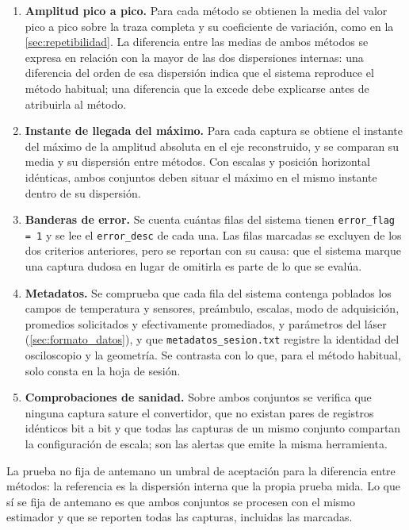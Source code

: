 \begin{enumerate}[leftmargin=*, itemsep=2pt]
  \item \textbf{Amplitud pico a pico.} Para cada método se obtienen la
    media del valor pico a pico sobre la traza completa y su
    coeficiente de variación, como en la \cref{sec:repetibilidad}. La
    diferencia entre las medias de ambos métodos se expresa en relación
    con la mayor de las dos dispersiones internas: una diferencia del
    orden de esa dispersión indica que el sistema reproduce el método
    habitual; una diferencia que la excede debe explicarse antes de
    atribuirla al método.
  \item \textbf{Instante de llegada del máximo.} Para cada captura se
    obtiene el instante del máximo de la amplitud absoluta en el eje
    reconstruido, y se comparan su media y su dispersión entre métodos.
    Con escalas y posición horizontal idénticas, ambos conjuntos deben
    situar el máximo en el mismo instante dentro de su dispersión.
  \item \textbf{Banderas de error.} Se cuenta cuántas filas del sistema
    tienen \texttt{error\_flag = 1} y se lee el \texttt{error\_desc} de
    cada una. Las filas marcadas se excluyen de los dos criterios
    anteriores, pero se reportan con su causa: que el sistema marque
    una captura dudosa en lugar de omitirla es parte de lo que se
    evalúa.
  \item \textbf{Metadatos.} Se comprueba que cada fila del sistema
    contenga poblados los campos de temperatura y sensores, preámbulo,
    escalas, modo de adquisición, promedios solicitados y
    efectivamente promediados, y parámetros del láser
    (\cref{sec:formato_datos}), y que \texttt{metadatos\_sesion.txt}
    registre la identidad del osciloscopio y la geometría. Se contrasta
    con lo que, para el método habitual, solo consta en la hoja de
    sesión.
  \item \textbf{Comprobaciones de sanidad.} Sobre ambos conjuntos se
    verifica que ninguna captura sature el convertidor, que no existan
    pares de registros idénticos bit a bit y que todas las capturas de
    un mismo conjunto compartan la configuración de escala; son las
    alertas que emite la misma herramienta.
\end{enumerate}

La prueba no fija de antemano un umbral de aceptación para la diferencia
entre métodos: la referencia es la dispersión interna que la propia
prueba mida. Lo que sí se fija de antemano es que ambos conjuntos se
procesen con el mismo estimador y que se reporten todas las capturas,
incluidas las marcadas.
